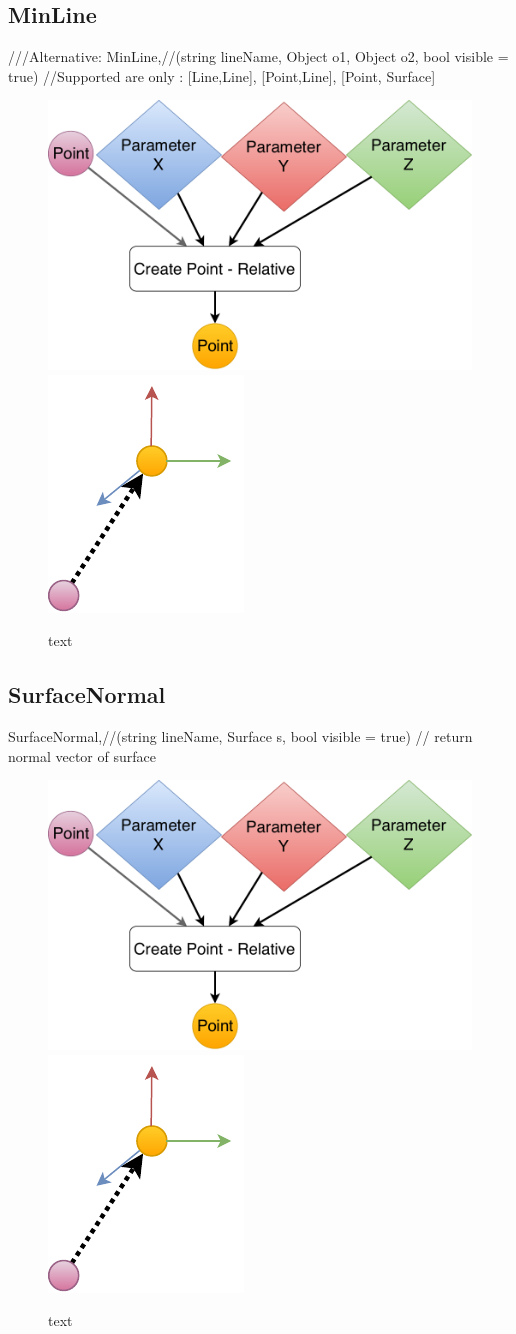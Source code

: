 \subsection{MinLine}
		///Alternative:
		MinLine,//(string lineName, Object o1, Object o2, bool visible = true) //Supported are only : [Line,Line], [Point,Line], [Point, Surface]


\begin{figure}[H]
	\centering
	\includegraphics[height=0.3\textwidth]{obrazky-figures/Diagram/DP Navrh operacii-0D - Point2.pdf}
	\includegraphics[height=0.3\textwidth]{obrazky-figures/Diagram/Draw/1Points/DP Navrh operacii-0D - PointRelative.pdf}
	\caption{text}
	\label{fig:1}
\end{figure}



\subsection{SurfaceNormal}
		SurfaceNormal,//(string lineName, Surface s, bool visible = true) // return normal vector of surface


\begin{figure}[H]
	\centering
	\includegraphics[height=0.3\textwidth]{obrazky-figures/Diagram/DP Navrh operacii-0D - Point2.pdf}
	\includegraphics[height=0.3\textwidth]{obrazky-figures/Diagram/Draw/1Points/DP Navrh operacii-0D - PointRelative.pdf}
	\caption{text}
	\label{fig:1}
\end{figure}



